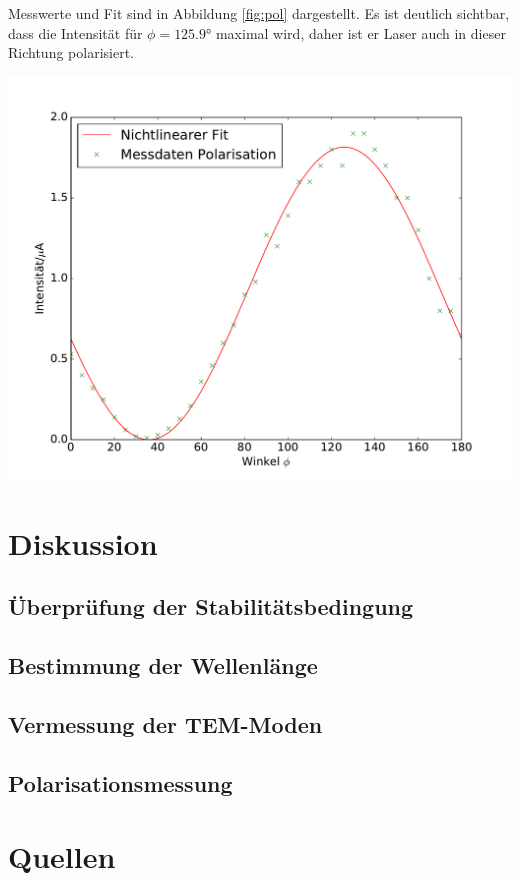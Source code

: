 \documentclass[]{scrartcl}
\begin{document}
Messwerte und Fit sind in Abbildung \ref{fig:pol} dargestellt. Es ist deutlich sichtbar, dass die Intensität für $\phi=\ang{125.9}$ maximal wird, daher ist er Laser auch in dieser Richtung polarisiert.
\begin{center}
 	\includegraphics[width=\textwidth]{images/polarisation.pdf}
 	\label{fig:pol}
\end{center}

\section{Diskussion}

\subsection{Überprüfung der Stabilitätsbedingung}

\subsection{Bestimmung der Wellenlänge}

\subsection{Vermessung der TEM-Moden}

\subsection{Polarisationsmessung}

\section{Quellen}
\end{document}
